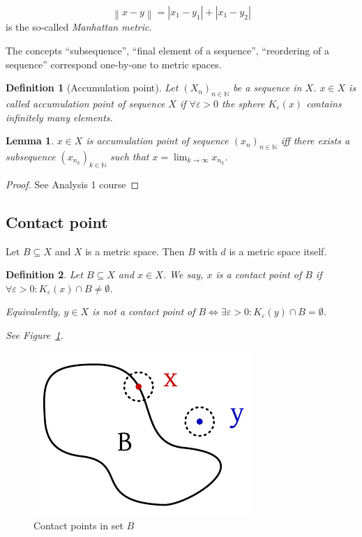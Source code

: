 \documentclass{article}
\newtheorem{definition}{Definition}  \numberwithin{definition}{section}
\newtheorem{lemma}{Lemma}  \numberwithin{lemma}{section}
\newcommand{\norm}[1]{\left\|#1\right\|}
\newcommand{\card}[1]{\left|#1\right|}
\begin{document}
\[ \norm{x - y} = \card{x_1 - y_1} + \card{x_1 - y_2} \]
is the so-called \emph{Manhattan metric}.

The concepts \enquote{subsequence}, \enquote{final element of a sequence}, \enquote{reordering of a sequence} correspond one-by-one to metric spaces.

\begin{definition}[Accumulation point]
  Let $(X_n)_{n\in\mathbb N}$ be a sequence in $X$. $x \in X$ is called \emph{accumulation point of sequence $X$}
  if $\forall \varepsilon > 0$ the sphere $K_{\varepsilon}(x)$ contains infinitely many elements.
\end{definition}

\begin{lemma}
  $x \in X$ is accumulation point of sequence $(x_n)_{n\in\mathbb N}$
  iff there exists a subsequence $(x_{n_k})_{k \in \mathbb N}$ such that
  $x = \lim_{k\to\infty} x_{n_k}$.
\end{lemma}

\begin{proof}
  See Analysis 1 course
\end{proof}

\subsection{Contact point}

Let $B \subseteq X$ and $X$ is a metric space. Then $B$ with $d$ is a metric space itself.

\begin{definition}
  Let $B \subseteq X$ and $x \in X$. We say, $x$ is a \emph{contact point of $B$}
  if $\forall \varepsilon > 0: K_{\varepsilon}(x) \cap B \neq \emptyset$.

  Equivalently, $y \in X$ is not a contact point of $B \iff \exists \varepsilon > 0: K_{\varepsilon}(y) \cap B = \emptyset$.

  See Figure~\ref{img:cp}.
\end{definition}

\begin{figure}
  \begin{center}
    \includegraphics{img/03_contact_point.pdf}
    \caption{Contact points in set $B$}
    \label{img:cp}
  \end{center}
\end{figure}
\end{document}
